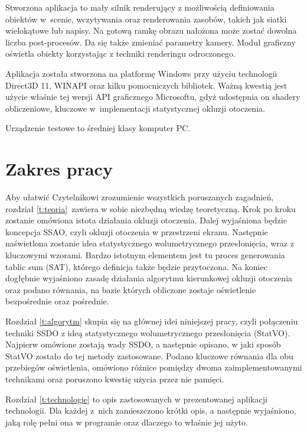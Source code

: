 	Stworzona aplikacja to mały silnik renderujący z możliwością definiowania obiektów w~scenie, wczytywania oraz renderowania zasobów, takich jak siatki wielokątowe lub napisy. Na gotową ramkę obrazu nałożona może zostać dowolna liczba post-procesów. Da się także zmieniać parametry kamery. Moduł graficzny oświetla obiekty korzystając z techniki renderingu odroczonego.
	
	Aplikacja została stworzona na platformę Windows przy użyciu technologii Direct3D 11, WINAPI oraz kilku pomocniczych bibliotek. Ważną kwestią jest użycie właśnie tej wersji API graficznego Microsoftu, gdyż udostępnia on shadery obliczeniowe, kluczowe w~implementacji statystycznej okluzji otoczenia.
	
	Urządzenie testowe to średniej klasy komputer PC.
	
	\section{Zakres pracy}
	\label{t:wprowadzenie:zakres}
	
	
	Aby ułatwić Czytelnikowi zrozumienie wszystkich poruszanych zagadnień, rozdział \ref{t:teoria}~zawiera w sobie niezbędną wiedzę teoretyczną. Krok po kroku zostanie omówiona istota działania okluzji otoczenia. Dalej wyjaśniona będzie koncepcja SSAO, czyli okluzji otoczenia w przestrzeni ekranu. Następnie naświetlona zostanie idea statystycznego wolumetrycznego przesłonięcia, wraz z kluczowymi wzorami. Bardzo istotnym elementem jest tu proces generowania tablic sum (SAT), którego definicja także będzie przytoczona. Na koniec dogłębnie wyjaśniono zasadę działania algorytmu kierunkowej okluzji otoczenia oraz podano równania, na bazie których obliczone zostaje oświetlenie bezpośrednie oraz pośrednie.
	
	Rozdział \ref{t:algorytm} skupia się na głównej idei niniejszej pracy, czyli połączeniu techniki SSDO z ideą statystycznego wolumetrycznego przesłonięcia (StatVO). Najpierw omówione zostają wady SSDO, a następnie opisano, w jaki sposób StatVO zostało do tej metody zastosowane. Podano kluczowe równania dla obu przebiegów oświetlenia, omówiono różnice pomiędzy dwoma zaimplementowanymi technikami oraz poruszono kwestię użycia przez nie pamięci.
	
	Rozdział \ref{t:technologie} to opis zastosowanych w prezentowanej aplikacji technologii. Dla każdej z~nich zamieszczono krótki opis, a następnie wyjaśniono, jaką rolę pełni ona w programie oraz dlaczego to właśnie jej użyto.
	
